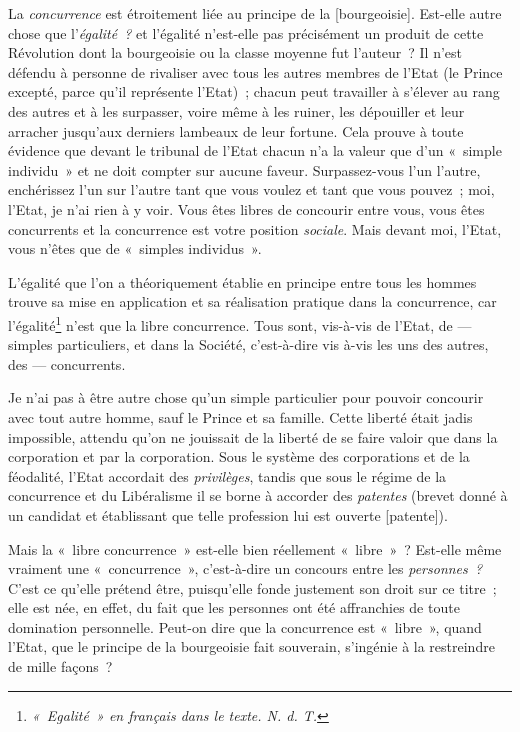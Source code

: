 \documentclass[french,twoside]{book} %
\newcommand\corr[1]{#1}
\begin{document}
\noindent La \emph{concurrence} est étroitement liée au principe de la [{\corr bourgeoisie}]. Est-elle autre chose que l’\emph{égalité ?} et l’égalité n’est-elle pas précisément un produit de cette Révolution dont la bourgeoisie ou la classe moyenne fut l’auteur ? Il n’est défendu à personne de rivaliser avec tous les autres membres de l’Etat (le Prince excepté, parce qu’il représente l’Etat) ; chacun peut  travailler à s’élever au rang des autres et à les surpasser, voire même à les ruiner, les dépouiller et leur arracher jusqu’aux derniers lambeaux de leur fortune. Cela prouve à toute évidence que devant le tribunal de l’Etat chacun n’a la valeur que d’un « simple individu » et ne doit compter sur aucune faveur. Surpassez-vous l’un l’autre, enchérissez l’un sur l’autre tant que vous voulez et tant que vous pouvez ; moi, l’Etat, je n’ai rien à y voir. Vous êtes libres de concourir entre vous, vous êtes concurrents et la concurrence est votre position \emph{sociale}. Mais devant moi, l’Etat, vous n’êtes que de « simples individus ».\par
L’égalité que l’on a théoriquement établie en principe entre tous les hommes trouve sa mise en application et sa réalisation pratique dans la concurrence, car l’égalité\footnote{ \noindent \emph{« Egalité » en français dans le texte. N. d. T.}
 } n’est que la libre concurrence. Tous sont, vis-à-vis de l’Etat, de — simples particuliers, et dans la Société, c’est-à-dire vis à-vis les uns des autres, des — concurrents.\par
Je n’ai pas à être autre chose qu’un simple particulier pour pouvoir concourir avec tout autre homme, sauf le Prince et sa famille. Cette liberté était jadis impossible, attendu qu’on ne jouissait de la liberté de se faire valoir que dans la corporation et par la corporation. Sous le système des corporations et de la féodalité, l’Etat accordait des \emph{privilèges}, tandis que sous le régime de la concurrence et du Libéralisme il se borne à accorder des \emph{patentes} (brevet donné à un candidat et établissant que telle profession lui est ouverte [patente]).\par
Mais la « libre concurrence » est-elle bien réellement « libre » ? Est-elle même vraiment une « concurrence », c’est-à-dire un concours entre les \emph{personnes ? }C’est ce qu’elle prétend être, puisqu’elle fonde justement son droit sur ce titre ; elle est née, en effet, du fait que les personnes ont été affranchies de toute domination  personnelle. Peut-on dire que la concurrence est « libre », quand l’Etat, que le principe de la bourgeoisie fait souverain, s’ingénie à la restreindre de mille façons ?\par
\end{document}

